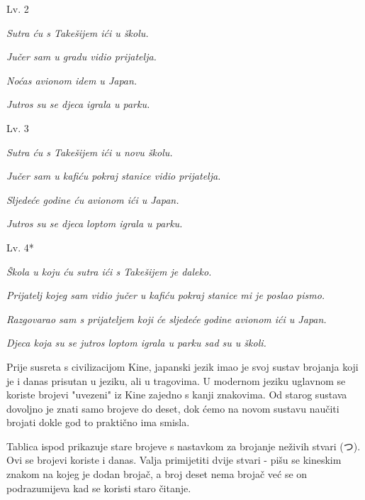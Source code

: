 	\begin{mondai}{Lv. 2}
		\item \textit{Sutra ću s Takešijem ići u školu.}
		\item \textit{Jučer sam u gradu vidio prijatelja.}
		\item \textit{Noćas avionom idem u Japan.}
		\item \textit{Jutros su se djeca igrala u parku.}
	\end{mondai}

	\begin{mondai}{Lv. 3}
		\item \textit{Sutra ću s Takešijem ići u novu školu.}
		\item \textit{Jučer sam u kafiću pokraj stanice vidio prijatelja.}
		\item \textit{Sljedeće godine ću avionom ići u Japan.}
		\item \textit{Jutros su se djeca loptom igrala u parku.}
	\end{mondai}

	\begin{mondai}{Lv. 4*}
		\item \textit{Škola u koju ću sutra ići s Takešijem je daleko.}
		\item \textit{Prijatelj kojeg sam vidio jučer u kafiću pokraj stanice mi je poslao pismo.}
		\item \textit{Razgovarao sam s prijateljem koji će sljedeće godine avionom ići u Japan.}
		\item \textit{Djeca koja su se jutros loptom igrala u parku sad su u školi.}
	\end{mondai}
\newpage
{}

	
	Prije susreta s civilizacijom Kine, japanski jezik imao je svoj sustav brojanja koji je i danas prisutan u jeziku, ali u tragovima. U modernom jeziku uglavnom se koriste brojevi "uvezeni" iz Kine zajedno s kanji znakovima. Od starog sustava dovoljno je znati samo brojeve do deset, dok ćemo na novom sustavu naučiti brojati dokle god to praktično ima smisla.
	
	
	Tablica ispod prikazuje stare brojeve s nastavkom za brojanje neživih stvari (つ). Ovi se brojevi koriste i danas. Valja primijetiti dvije stvari - pišu se kineskim znakom na kojeg je dodan brojač, a broj deset nema brojač već se on podrazumijeva kad se koristi staro čitanje.

